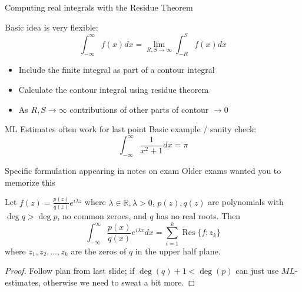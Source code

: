 \documentclass{beamer}
\newcommand{\R}{\mathbb{R}}
\DeclareMathOperator{\Res}{Res}
\begin{document}
\begin{frame}{Computing real integrals with the Residue Theorem}

\begin{block}{Basic idea is very flexible:}
$$\int_{-\infty}^\infty f(x)dx=\lim_{R,S\to\infty}\int_{-R}^S f(x)dx$$
\begin{itemize}
    \item  Include the finite integral as part of a contour integral
    \item Calculate the contour integral using residue theorem
    \item As $R,S\to\infty$ contributions of other parts of contour $\to 0$
    \end{itemize}
\end{block}



\begin{block}{ML Estimates often work for last point}
Basic example / sanity check: 
$$\int_{-\infty}^\infty \frac{1}{x^2+1}dx=\pi$$
\end{block}
\end{frame}

\begin{frame}{Specific formulation appearing in notes on exam}
Older exams wanted you to memorize this \Sey[2][yellow]
\begin{theorem}
Let $f(z)=\frac{p(z)}{q(z)}e^{i\lambda z}$
where $\lambda\in\R, \lambda>0$, $p(z),q(z)$ are polynomials with $\deg q>\deg p$, no common zeroes, and $q$ has no real roots.  Then
$$\int_{-\infty}^\infty \frac{p(x)}{q(x)} e^{i\lambda x} dx=\sum_{i=1}^k\Res\{f;z_k\}$$
where $z_1, z_2,\dots, z_k$ are the zeros of $q$ in the upper half plane.
\end{theorem}
\begin{proof}
Follow plan from last slide; if $\deg(q)+1<\deg(p)$ can just use $ML$-estimates, otherwise we need to sweat a bit more.
\end{proof}


\end{frame}
\end{document}
